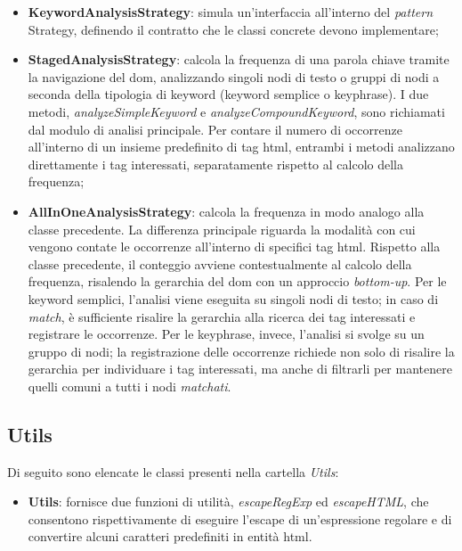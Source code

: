 \begin{itemize}
  \item \textbf{KeywordAnalysisStrategy}: simula un’interfaccia all’interno del \textit{pattern} Strategy, definendo il contratto che le classi concrete devono implementare;
  \item \textbf{StagedAnalysisStrategy}: calcola la frequenza di una parola chiave tramite la navigazione del \gls{dom}, analizzando singoli nodi di testo o gruppi di nodi a seconda della tipologia di keyword (keyword semplice o keyphrase). I due metodi, \textit{analyzeSimpleKeyword} e \textit{analyzeCompoundKeyword}, sono richiamati dal modulo di analisi principale. Per contare il numero di occorrenze all’interno di un insieme predefinito di tag \gls{html}, entrambi i metodi analizzano direttamente i tag interessati, separatamente rispetto al calcolo della frequenza;
  \item \textbf{AllInOneAnalysisStrategy}: calcola la frequenza in modo analogo alla classe precedente. La differenza principale riguarda la modalità con cui vengono contate le occorrenze all’interno di specifici tag \gls{html}. Rispetto alla classe precedente, il conteggio avviene contestualmente al calcolo della frequenza, risalendo la gerarchia del \gls{dom} con un approccio \textit{bottom-up}. Per le keyword semplici, l’analisi viene eseguita su singoli nodi di testo; in caso di \textit{match}, è sufficiente risalire la gerarchia alla ricerca dei tag interessati e registrare le occorrenze. Per le keyphrase, invece, l’analisi si svolge su un gruppo di nodi; la registrazione delle occorrenze richiede non solo di risalire la gerarchia per individuare i tag interessati, ma anche di filtrarli per mantenere quelli comuni a tutti i nodi \textit{matchati}.
\end{itemize}

\subsection{Utils}

\par Di seguito sono elencate le classi presenti nella cartella \textit{Utils}:

\begin{itemize}
  \item \textbf{Utils}: fornisce due funzioni di utilità, \textit{escapeRegExp} ed \textit{escapeHTML}, che consentono rispettivamente di eseguire l’escape di un’espressione regolare e di convertire alcuni caratteri predefiniti in entità \gls{html}. 
\end{itemize}

